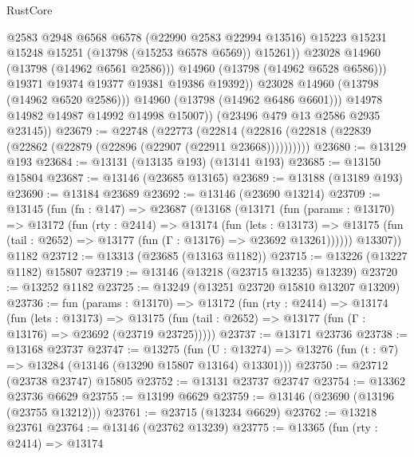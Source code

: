 \begin{lexlean}{RustCore}
\begin{coremodule}
                          @2583
                          @2948
                          @6568
                          @6578
                          (@22990 @2583 @22994 @13516)
                          @15223
                          @15231
                          @15248
                          @15251
                          (@13798 (@15253 @6578 @6569))
                          @15261))
                      @23028
                      @14960
                      (@13798 (@14962 @6561 @2586)))
                    @14960
                    (@13798 (@14962 @6528 @6586)))
                  @19371
                  @19374
                  @19377
                  @19381
                  @19386
                  @19392))
              @23028
              @14960
              (@13798 (@14962 @6520 @2586)))
            @14960
            (@13798 (@14962 @6486 @6601)))
          @14978
          @14982
          @14987
          @14992
          @14998
          @15007))
      (@23496 @479 @13 @2586 @2935 @23145))
@23679 := @22748
    (@22773 (@22814 (@22816 (@22818 (@22839 (@22862 (@22879 (@22896 (@22907 (@22911 @23668))))))))))
@23680 := @13129 @193
@23684 := @13131 (@13135 @193) (@13141 @193)
@23685 := @13150 @15804
@23687 := @13146 (@23685 @13165)
@23689 := @13188 (@13189 @193)
@23690 := @13184 @23689
@23692 := @13146 (@23690 @13214)
@23709 := @13145
    (fun (fn : @147) =>
    @23687
      (@13168
        (@13171
          (fun (params : @13170) =>
          @13172
            (fun (rty : @2414) =>
            @13174
              (fun (lets : @13173) =>
              @13175 (fun (tail : @2652) => @13177 (fun (Γ : @13176) => @23692 @13261))))))
        @13307))
    @1182
@23712 := @13313 (@23685 (@13163 @1182))
@23715 := @13226 (@13227 @1182) @15807
@23719 := @13146 (@13218 (@23715 @13235) @13239)
@23720 := @13252 @1182
@23725 := @13249 (@13251 @23720 @15810 @13207 @13209)
@23736 := fun (params : @13170) =>
  @13172
    (fun (rty : @2414) =>
    @13174
      (fun (lets : @13173) =>
      @13175 (fun (tail : @2652) => @13177 (fun (Γ : @13176) => @23692 (@23719 @23725)))))
@23737 := @13171 @23736
@23738 := @13168 @23737
@23747 := @13275
    (fun (U : @13274) => @13276 (fun (t : @7) => @13284 (@13146 (@13290 @15807 @13164) @13301)))
@23750 := @23712 (@23738 @23747) @15805
@23752 := @13131 @23737 @23747
@23754 := @13362 @23736 @6629
@23755 := @13199 @6629
@23759 := @13146 (@23690 (@13196 (@23755 @13212)))
@23761 := @23715 (@13234 @6629)
@23762 := @13218 @23761
@23764 := @13146 (@23762 @13239)
@23775 := @13365
    (fun (rty : @2414) =>
    @13174

\end{coremodule}
\end{lexlean}
